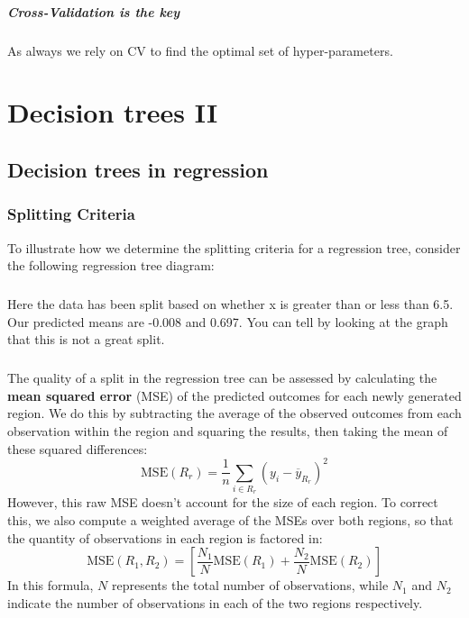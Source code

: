 \documentclass[10pt,a4paper]{report}
\begin{document}
\paragraph{Cross-Validation is the key} As always we rely on CV to find the optimal set of hyper-parameters.
\pagebreak
\chapter{Decision trees II}
\section{Decision trees in regression}
\subsection{Splitting Criteria}
To illustrate how we determine the splitting criteria for a regression tree, consider the following regression tree diagram:\\
\paragraph{}Here the data has been split based on whether x is greater than or less than 6.5. Our predicted means are -0.008 and 0.697. You can tell by looking at the graph that this is not a great split.
\paragraph{}The quality of a split in the regression tree can be assessed by calculating the \textbf{mean squared error} (MSE) of the predicted outcomes for each newly generated region. We do this by subtracting the average of the observed outcomes from each observation within the region and squaring the results, then taking the mean of these squared differences:
$$\textrm{MSE}(R_r)=\frac{1}{n}\sum_{i\in R_r} (y_i-\overline{y}_{R_r})^2$$
However, this raw MSE doesn't account for the size of each region. To correct this, we also compute a weighted average of the MSEs over both regions, so that the quantity of observations in each region is factored in:
$$\textrm{MSE}(R_1,R_2) = \left[\frac{N_1}{N}\textrm{MSE}(R_1)+\frac{N_2}{N}\textrm{MSE}(R_2)\right]$$
In this formula, $N$ represents the total number of observations, while $N_1$ and $N_2	$ indicate the number of observations in each of the two regions respectively.
\end{document}
